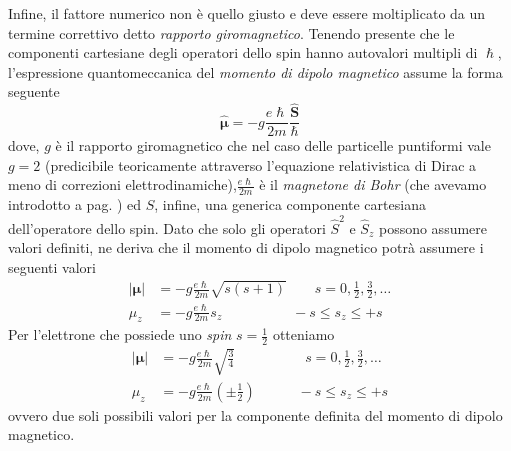 Infine, il fattore numerico non è quello giusto e deve essere moltiplicato da un termine correttivo detto \emph{rapporto giromagnetico}.
Tenendo presente che le componenti cartesiane degli operatori dello spin hanno autovalori multipli di $\hslash$, l’espressione quantomeccanica del \emph{momento di dipolo magnetico} assume la forma seguente
\begin{equation}
	\hat{\bm{\mu}} = - g  \frac{e\hslash}{2 m} \frac{\hat{\bm{S}}}{\hslash}
	\label{eq:quantum-magnetic-dipole-moment}
\end{equation}
dove, $g$ è il rapporto giromagnetico che nel caso delle particelle puntiformi vale $g=2$ (predicibile teoricamente attraverso l’equazione relativistica di Dirac a meno di correzioni elettrodinamiche),$\frac{e\hslash}{2m}$ è il \emph{magnetone di Bohr} (che avevamo introdotto a pag. \pageref{eq:qm-magnetic-dipole-moment}) ed $S$, infine, una generica componente cartesiana dell’operatore dello spin.
Dato che solo gli operatori ${\hat{S}}^{2}$ e ${\hat{S}}_{z}$ possono assumere valori definiti, ne deriva che il momento di dipolo magnetico potrà assumere i seguenti valori
\begin{align*}
	| \bm{\mu} | &= -g  \frac{e\hslash}{2m} \sqrt{ s(s+1) } \qquad s= 0, \frac{1}{2}, \frac{3}{2}, \dots \\
	\mu_{z} &= -g  \frac{e\hslash}{2m} s_{z} \qquad \quad \qquad-s \leq s_{z} \leq +s
\end{align*}
Per l'elettrone che possiede uno \emph{spin} $s = \frac{1}{2}$ otteniamo
\begin{align*}
	| \bm{\mu} | &= -g  \frac{e\hslash}{2m} \sqrt{ \frac{3}{4} } \qquad \qquad \quad  s= 0, \frac{1}{2}, \frac{3}{2}, \dots \\
	\mu_{z} &= -g  \frac{e\hslash}{2m} \left( \pm \frac{1}{2} \right) \qquad \quad -s \leq s_{z} \leq +s
\end{align*}
ovvero due soli possibili valori per la componente definita del momento di dipolo magnetico.

